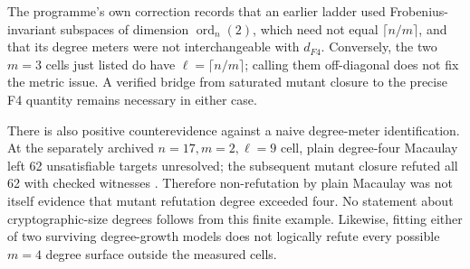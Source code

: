  The programme's own correction
 records that an earlier ladder used
Frobenius-invariant subspaces of dimension $\operatorname{ord}_n(2)$,
which need not equal $\lceil n/m\rceil$, and that its degree meters were
not interchangeable with $d_{F4}$. Conversely, the two $m=3$ cells just
listed do have $\ell=\lceil n/m\rceil$; calling them off-diagonal does
not fix the metric issue. A verified bridge from saturated mutant
closure to the precise F4 quantity remains necessary in either case.

There is also positive counterevidence against a naive degree-meter
identification. At the separately archived $n=17,m=2,\ell=9$ cell,
plain degree-four Macaulay left 62 unsatisfiable targets unresolved;
the subsequent mutant closure refuted all 62 with checked witnesses
\cite{closureCorrection}. Therefore non-refutation by plain Macaulay
was not itself evidence that mutant refutation degree exceeded four.
No statement about cryptographic-size degrees follows from this finite
example. Likewise, fitting either of two surviving degree-growth models
does not logically refute every possible $m=4$ degree surface outside
the measured cells.
